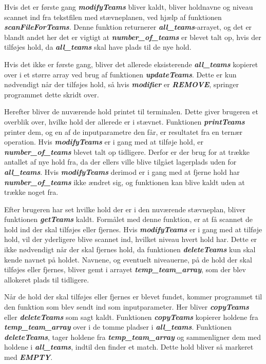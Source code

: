 \par
Hvis det er første gang \textbf{\textit{modifyTeams}} bliver kaldt, bliver holdnavne og niveau scannet ind fra tekstfilen med stævneplanen, ved hjælp af funktionen \textbf{\textit{scanFileForTeams}}. Denne funktion returnerer \textbf{\textit{all\_teams}}-arrayet, og det er blandt andet her det er vigtigt at \textbf{\textit{number\_of\_teams}} er blevet talt op, hvis der tilføjes hold, da \textbf{\textit{all\_teams}} skal have plads til de nye hold.
\par
Hvis det ikke er første gang, bliver det allerede eksisterende \textbf{\textit{all\_teams}} kopieret over i et større array ved brug af funktionen \textbf{\textit{updateTeams}}. Dette er kun nødvendigt når der tilføjes hold, så hvis \textbf{\textit{modifier}} er \textbf{\textit{REMOVE}}, springer programmet dette skridt over.
\par
Herefter bliver de nuværende hold printet til terminalen. Dette giver brugeren et overblik over, hvilke hold der allerede er i stævnet. Funktionen \textbf{\textit{printTeams}} printer dem, og en af de inputparametre den får, er resultatet fra en ternær operation. Hvis \textbf{\textit{modifyTeams}} er i gang med at tilføje hold, er \textbf{\textit{number\_of\_teams}} blevet talt op tidligere. Derfor er der brug for at trække antallet af nye hold fra, da der ellers ville blive tilgået lagerplads uden for \textbf{\textit{all\_teams}}. Hvis \textbf{\textit{modifyTeams}} derimod er i gang med at fjerne hold har \textbf{\textit{number\_of\_teams}} ikke ændret sig, og funktionen kan blive kaldt uden at trække noget fra.
\par
Efter brugeren har set hvilke hold der er i den nuværende stævneplan, bliver funktionen \textbf{\textit{getTeams}} kaldt. Formålet med denne funktion, er at få scannet de hold ind der skal tilføjes eller fjernes. Hvis \textbf{\textit{modifyTeams}} er i gang med at tilføje hold, vil der yderligere blive scannet ind, hvilket niveau hvert hold har. Dette er ikke nødvendigt når der skal fjernes hold, da funktionen \textbf{\textit{deleteTeams}} kun skal kende navnet på holdet. Navnene, og eventuelt niveauerne, på de hold der skal tilføjes eller fjernes, bliver gemt i arrayet \textbf{\textit{temp\_team\_array}}, som der blev allokeret plads til tidligere. 
\par
Når de hold der skal tilføjes eller fjernes er blevet fundet, kommer programmet til den funktion som blev sendt ind som inputparameter. Her bliver \textbf{\textit{copyTeams}} eller \textbf{\textit{deleteTeams}} som sagt kaldt. Funktionen \textbf{\textit{copyTeams}} kopierer holdene fra \textbf{\textit{temp\_team\_array}} over i de tomme pladser i \textbf{\textit{all\_teams}}. Funktionen \textbf{\textit{deleteTeams}}, tager holdene fra \textbf{\textit{temp\_team\_array}} og sammenligner dem med holdene i \textbf{\textit{all\_teams}}, indtil den finder et match. Dette hold bliver så markeret med \textbf{\textit{EMPTY}}.
